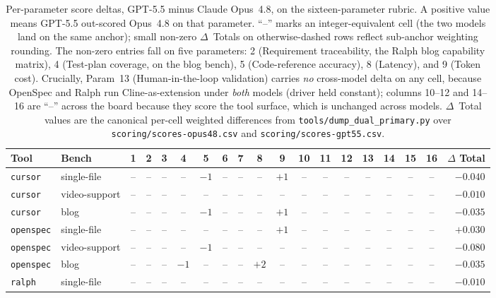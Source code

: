 \begin{table}[h]
\centering
\caption{Per-parameter score deltas, GPT-5.5 minus
Claude Opus~4.8, on the sixteen-parameter rubric. A positive
value means GPT-5.5 out-scored Opus~4.8 on that parameter. ``--'' marks
an integer-equivalent cell (the two models land on the same anchor);
small non-zero $\Delta$~Totals on otherwise-dashed rows reflect
sub-anchor weighting rounding. The non-zero entries fall on five
parameters: 2 (Requirement traceability, the Ralph blog capability
matrix), 4 (Test-plan coverage, on the blog bench), 5 (Code-reference
accuracy), 8 (Latency), and 9 (Token cost). Crucially, Param~13
(Human-in-the-loop validation) carries \emph{no} cross-model delta on
any cell, because OpenSpec and Ralph run Cline-as-extension under
\emph{both} models (driver held constant);
columns 10--12 and 14--16 are ``--'' across the board because they
score the tool surface, which is unchanged across models. $\Delta$~Total
values are the canonical per-cell weighted differences from
\texttt{tools/dump\_dual\_primary.py} over \texttt{scoring/scores-opus48.csv}
and \texttt{scoring/scores-gpt55.csv}.}
\label{tab:cross-model-delta}
\renewcommand{\arraystretch}{1.05}
\setlength{\tabcolsep}{2pt}
\small
\begin{tabular}{l l cccccccccccccccc r}
\toprule
Tool & Bench & 1 & 2 & 3 & 4 & 5 & 6 & 7 & 8 & 9 & 10 & 11 & 12 & 13 & 14 & 15 & 16 & $\Delta$ Total \\
\midrule
\texttt{cursor}   & single-file  & -- & -- & -- & -- & $-1$ & -- & -- & --   & $+1$ & -- & -- & -- & -- & -- & -- & -- & $-0.040$ \\
\texttt{cursor}   & video-support & -- & -- & -- & -- & --   & -- & -- & --   & --   & -- & -- & -- & -- & -- & -- & -- & $-0.010$ \\
\texttt{cursor}   & blog    & -- & -- & -- & -- & $-1$ & -- & -- & --   & $+1$ & -- & -- & -- & -- & -- & -- & -- & $-0.035$ \\
\texttt{openspec} & single-file  & -- & -- & -- & -- & --   & -- & -- & --   & $+1$ & -- & -- & -- & -- & -- & -- & -- & $+0.030$ \\
\texttt{openspec} & video-support & -- & -- & -- & -- & $-1$ & -- & -- & --   & --   & -- & -- & -- & -- & -- & -- & -- & $-0.080$ \\
\texttt{openspec} & blog    & -- & -- & -- & $-1$ & --   & -- & -- & $+2$ & --   & -- & -- & -- & -- & -- & -- & -- & $-0.035$ \\
\texttt{ralph}    & single-file  & -- & -- & -- & -- & --   & -- & -- & --   & --   & -- & -- & -- & -- & -- & -- & -- & $-0.010$ \\

\end{tabular}
\end{table}

